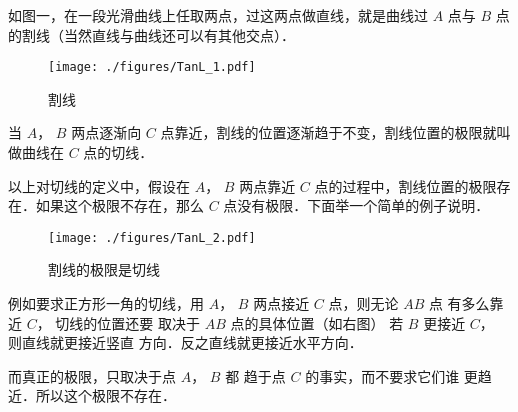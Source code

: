 

如图一，在一段光滑曲线上任取两点，过这两点做直线，就是曲线过 $A$ 点与 $B$ 点的割线（当然直线与曲线还可以有其他交点）．
\begin{figure}[ht]
\centering
\texttt{[image: ./figures/TanL\_1.pdf]}
\caption{割线}
\end{figure}
当 $A$，  $B$ 两点逐渐向 $C$ 点靠近，割线的位置逐渐趋于不变，割线位置的极限就叫做曲线在 $C$ 点的切线．

以上对切线的定义中，假设在 $A$，  $B$ 两点靠近 $C$ 点的过程中，割线位置的极限存在．如果这个极限不存在，那么 $C$ 点没有极限．下面举一个简单的例子说明．

\begin{figure}[ht]
\vskip 0pt
\centering
\texttt{[image: ./figures/TanL\_2.pdf]}
\caption{割线的极限是切线}
\end{figure}
例如要求正方形一角的切线，用
 $A$，  $B$ 两点接近 $C$ 点，则无论 $AB$ 点
有多么靠近 $C$， 切线的位置还要
取决于 $AB$ 点的具体位置（如右图）
若 $B$ 更接近 $C$， 则直线就更接近竖直
方向．反之直线就更接近水平方向．


而真正的极限，只取决于点 $A$，  $B$ 都
趋于点 $C$ 的事实，而不要求它们谁
更趋近．所以这个极限不存在．
